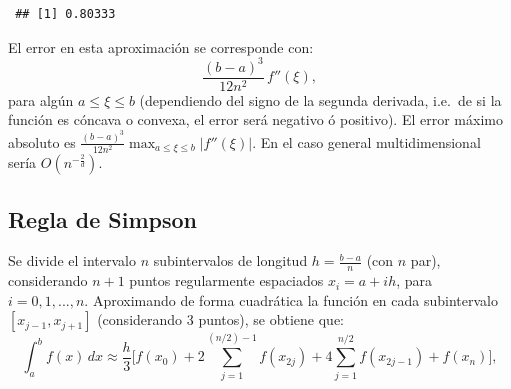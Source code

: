\documentclass[
  10pt,
]{book}
\theoremstyle{break}
\theoremstyle{nonumberplain}
\begin{document}
\begin{verbatim}
 ## [1] 0.80333
\end{verbatim}

El error en esta aproximación se corresponde con:
\[ \frac{(b-a)^3}{12n^2}\,f''(\xi), \]
para algún \(a\leq \xi \leq b\) (dependiendo del signo de la segunda derivada,
i.e.~de si la función es cóncava o convexa, el error será negativo ó positivo). El error
máximo absoluto es \(\frac{(b-a)^3}{12n^2}\max_{a\leq \xi \leq b}\left|f''(\xi)\right|\).
En el caso general multidimensional sería \(O(n^{-\frac{2}{d}})\).

\hypertarget{regla-de-simpson}{%
\subsection{Regla de Simpson}\label{regla-de-simpson}}

Se divide el intervalo \(n\) subintervalos de longitud \(h= \frac{b-a}{n}\) (con \(n\) par),
considerando \(n + 1\) puntos regularmente espaciados \(x_i = a + ih\), para \(i = 0, 1, ..., n\).
Aproximando de forma cuadrática la función en cada subintervalo \([x_{j-1},x_{j+1}]\)
(considerando 3 puntos), se obtiene que:
\[ \int_a^b f(x) \, dx \approx \frac{h}{3} \bigg[ 
f(x_0)+2\sum_{j=1}^{(n/2)-1}f(x_{2j})+ 4\sum_{j=1}^{n/2}f(x_{2j-1})+f(x_n) \bigg],\]
\end{document}
